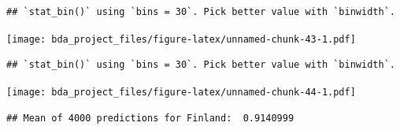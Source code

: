 \documentclass[
]{article}
\newenvironment{Shaded}{\begin{snugshade}}{\end{snugshade}}
\newcommand{\AttributeTok}[1]{\textcolor[rgb]{0.77,0.63,0.00}{#1}}
\newcommand{\DecValTok}[1]{\textcolor[rgb]{0.00,0.00,0.81}{#1}}
\newcommand{\FunctionTok}[1]{\textcolor[rgb]{0.00,0.00,0.00}{#1}}
\newcommand{\NormalTok}[1]{#1}
\newcommand{\SpecialCharTok}[1]{\textcolor[rgb]{0.00,0.00,0.00}{#1}}
\newcommand{\StringTok}[1]{\textcolor[rgb]{0.31,0.60,0.02}{#1}}
\begin{document}
\begin{verbatim}
## `stat_bin()` using `bins = 30`. Pick better value with `binwidth`.
\end{verbatim}

\texttt{[image: bda\_project\_files/figure-latex/unnamed-chunk-43-1.pdf]}

\begin{Shaded}
\end{Shaded}

\begin{verbatim}
## `stat_bin()` using `bins = 30`. Pick better value with `binwidth`.
\end{verbatim}

\texttt{[image: bda\_project\_files/figure-latex/unnamed-chunk-44-1.pdf]}

\begin{Shaded}
\end{Shaded}

\begin{verbatim}
## Mean of 4000 predictions for Finland:  0.9140999
\end{verbatim}

\begin{Shaded}
\end{Shaded}
\end{document}
